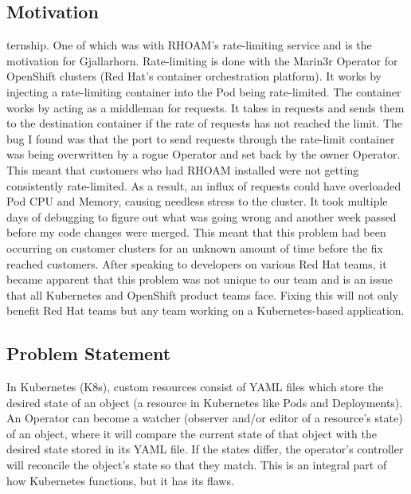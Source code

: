 \documentclass{article}
\begin{document}
\subsection{Motivation}
ternship. One of which was with RHOAM’s rate-limiting service and is the motivation for Gjallarhorn. Rate-limiting is done with the Marin3r Operator for OpenShift clusters (Red Hat’s container orchestration platform). It works by injecting a rate-limiting container into the Pod being rate-limited. The container works by acting as a middleman for requests. It  takes in requests and sends them to the destination container if the rate of requests has not reached the limit. The bug I found was that the port to send requests through the rate-limit container was being overwritten by a rogue Operator and set back by the owner Operator. This meant that customers who had RHOAM installed were not getting consistently rate-limited. As a result, an influx of requests could have overloaded Pod CPU and Memory, causing needless stress to the cluster.
It took multiple days of debugging to figure out what was going wrong and another week passed before my code changes were merged. This meant that this problem had been occurring on customer clusters for an unknown amount of time before the fix reached customers. After speaking to developers on various Red Hat teams, it became apparent that this problem was not unique to our team and is an issue that all Kubernetes and OpenShift product teams face. Fixing this will not only benefit Red Hat teams but any team working on a Kubernetes-based application.

\subsection{Problem Statement}
In Kubernetes (K8s), custom resources consist of YAML files which store the desired state of an object (a resource in Kubernetes like Pods and Deployments). 
An Operator can become a watcher (observer and/or editor of a resource’s state) of an object, where it will compare the current state of that object with the desired state stored in its YAML file. 
If the states differ, the operator’s controller will reconcile the object’s state so that they match. This is an integral part of how Kubernetes functions, but it has its flaws. 
\end{document}
